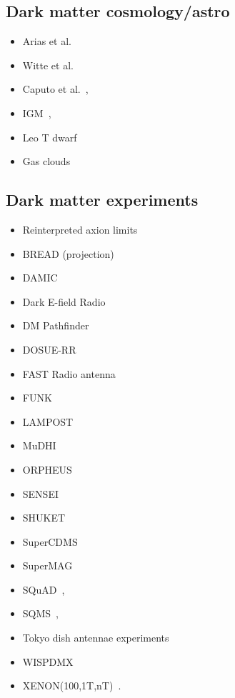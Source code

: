 \documentclass[11pt,twocolumn]{extarticle}
\begin{document}
\begin{mdframed}
\subsection*{Dark matter cosmology/astro}\vspace{-0.5em}
\begin{itemize}\setlength\itemsep{-0.5em}
\item  Arias et al.~\cite{Arias:2012az}
\item Witte et al.~\cite{McDermott:2019lch,Witte:2020rvb}
 \item  Caputo et al.~\cite{Caputo:2020rnx,Caputo:2020bdy}, 
 \item  IGM~\cite{Dubovsky:2015cca},
 \item  Leo T dwarf~\cite{Wadekar:2019xnf}
 \item  Gas clouds~\cite{Bhoonah:2019eyo}
\end{itemize}

\subsection*{Dark matter experiments}\vspace{-0.5em}
\begin{itemize}\setlength\itemsep{-0.5em}
\item Reinterpreted axion limits~\cite{Caputo:2021eaa}
\item BREAD (projection)~\cite{Liu:2021pei}
\item DAMIC~\cite{Aguilar-Arevalo:2019wdi}
\item Dark E-field Radio~\cite{Godfrey:2021tvs}
\item DM Pathfinder~\cite{Phipps:2019cqy}
\item DOSUE-RR~\cite{DOSUE-RR:2022ise}
 \item FAST Radio antenna~\cite{An:2022hhb}
\item FUNK~\cite{Andrianavalomahefa:2020ucg}
\item LAMPOST~\cite{Chiles:2021gxk}
\item MuDHI~\cite{Manenti:2021whp}
\item ORPHEUS~\cite{Cervantes:2022yzp}
\item SENSEI~\cite{Barak:2020fql}
\item SHUKET~\cite{Brun:2019kak}
\item SuperCDMS~\cite{Aralis:2019nfa}
\item SuperMAG~\cite{Fedderke:2021rrm,Fedderke:2021aqo}
\item SQuAD~\cite{Dixit:2020ymh},
\item SQMS~\cite{Cervantes:2022gtv},
\item Tokyo dish antennae experiments~\cite{Suzuki:2015sza,Knirck:2018ojz,Tomita:2020usq}
\item  WISPDMX~\cite{Nguyen:2019xuh}
\item  XENON(100,1T,nT)~\cite{Bloch:2016sjj,Aprile:2019xxb,Aprile:2020tmw, Bloch:2020uzh,XENON:2021myl,An:2020bxd}. 
\end{itemize}
\end{mdframed}


\onecolumn{


}
\end{document}
